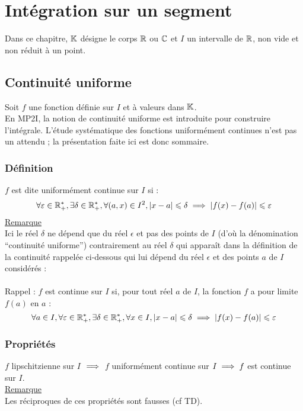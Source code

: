 \chapter{Intégration sur un segment}

\minitoc
Dans ce chapitre, \(\mathbb{K}\) désigne le corps \(\mathbb{R}\) ou \(\mathbb{C}\) et \(I\) un intervalle de \(\mathbb{R}\), non vide et non réduit à un point.

\section{Continuité uniforme}
    Soit \(f\) une fonction définie sur \(I\) et à valeurs dans \(\mathbb{K}\).\\
    En MP2I, la notion de continuité uniforme est introduite pour construire l’intégrale. L’étude systématique des fonctions uniformément continues n’est pas un attendu ; la présentation faite ici est donc sommaire.

\subsection{Définition}
\begin{defi}
    
\end{defi}
    \(f\) est dite uniformément continue sur \(I\) si :
    \[\forall \varepsilon  \in  \mathbb{R}_+^*, \exists \delta  \in  \mathbb{R}_+^*, \forall (a, x) \in  I^2, \left\lvert x -  a\right\rvert \leqslant \delta  \implies \left\lvert f (x) -  f (a)\right\rvert \leqslant \varepsilon \]
    \underline{Remarque}\\
    Ici le réel \(\delta\)  ne dépend que du réel \(\epsilon\)  et pas des points de \(I\) (d’où la dénomination “continuité uniforme”) contrairement au réel \(\delta\)  qui apparaît dans la définition de la continuité rappelée ci-dessous qui lui dépend du réel \(\epsilon\)  et des points \(a\) de \(I\) considérés :\\~\\
    Rappel : \(f\) est continue sur \(I\) si, pour tout réel \(a\) de \(I\), la fonction \(f\) a pour limite \(f (a) \) en \(a\) :
    \[\forall a \in  I, \forall \varepsilon  \in  \mathbb{R}_+^* , \exists \delta  \in  \mathbb{R}_+^*, \forall x \in  I, \left\lvert x -  a\right\rvert \leqslant \delta  \implies \left\lvert f (x) -  f (a)\right\rvert \leqslant \varepsilon\] 
\subsection{Propriétés}
\begin{prop}
    \(f\) lipschitzienne sur \(I\) \(\implies\) \(f\) uniformément continue sur \(I \implies f\) est continue sur \(I\).\\
    \underline{Remarque}\\
    Les réciproques de ces propriétés sont fausses (cf TD).
\end{prop}
